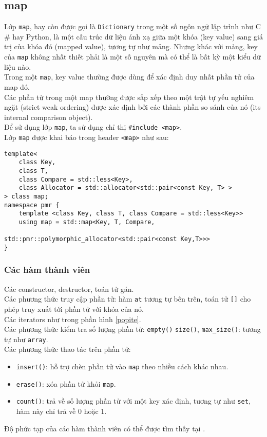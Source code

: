 \subsection{map}
Lớp \lstinline{map}, hay còn được gọi là \lstinline{Dictionary} trong một số ngôn ngữ lập trình như C$\#$ hay Python, là một cấu trúc dữ liệu ánh xạ giữa một khóa (key value) sang giá trị của khóa đó (mapped value), tương tự như mảng.
Nhưng khác với mảng, key của \lstinline{map} không nhất thiết phải là một số nguyên mà có thể là bất kỳ một kiểu dữ liệu nào.\\
Trong một \lstinline{map}, key value thường được dùng để xác định duy nhất phần tử của map đó. \\
Các phần tử trong một map thường được sắp xếp theo một trật tự yếu nghiêm ngặt (strict weak ordering) được xác định bởi các thành phần so sánh của nó (its internal comparison object). \cite{map}\\
Để sử dụng lớp \lstinline{map}, ta sử dụng chỉ thị \lstinline{#include <map>}.\\
Lớp \lstinline{map} được khai báo trong header  \lstinline{<map>} như sau: \cite{othermap}
\begin{lstlisting}
template<
    class Key,
    class T,
    class Compare = std::less<Key>,
    class Allocator = std::allocator<std::pair<const Key, T> >
> class map;
namespace pmr {
    template <class Key, class T, class Compare = std::less<Key>>
    using map = std::map<Key, T, Compare,
                         std::pmr::polymorphic_allocator<std::pair<const Key,T>>>
}
\end{lstlisting}
\subsubsection{Các hàm thành viên}
Các constructor, destructor, toán tử gán.\\
Các phương thức truy cập phần tử: hàm \lstinline{at} tương tự bên trên, toán tử \lstinline{[]} cho phép truy xuất tới phần tử với khóa của nó.\\
Các iterators như trong phần hình \ref{popite}.\\
Các phương thức kiểm tra số lượng phần tử: \lstinline{empty()} \lstinline{size()}, \lstinline{max_size()}: tương tự như \lstinline{array}.\\
Các phương thức thao tác trên phần tử:
\begin{itemize}
    \item \lstinline{insert()}: hỗ trợ chèn phần tử vào \lstinline{map} theo nhiều cách khác nhau.
    \item \lstinline{erase()}: xóa phần tử khỏi \lstinline{map}.
    \item \lstinline{count()}: trả về số lượng phần tử với một key xác định, tương tự như \lstinline{set}, hàm này chỉ trả về 0 hoặc 1.
\end{itemize}
Độ phức tạp của các hàm thành viên có thể được tìm thấy tại \cite{map}.

